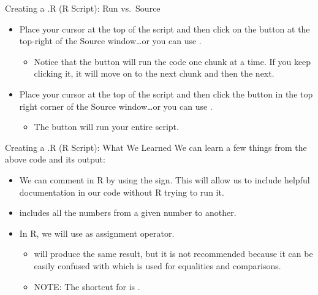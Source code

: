 \begin{frame}{Creating a .R (R Script): Run vs.\ Source}
\begin{itemize}
  \item Place your cursor at the top of the script and then click on the  button at the top-right of the Source window\ldots or you can use .
  \begin{itemize}
    \item Notice that the  button will run the code one chunk at a time. If you keep clicking it, it will move on to the next chunk and then the next.
  \end{itemize}
  \item Place your cursor at the top of the script and then click the  button in the top right corner of the Source window\ldots or you can use .
  \begin{itemize}
    \item The  button will run your entire script.
  \end{itemize}
\end{itemize}
\end{frame}

\begin{frame}{Creating a .R (R Script): What We Learned}
We can learn a few things from the above code and its output:
\begin{itemize}
  \item We can comment in R by using the \code{\#} sign. This will allow us to include helpful documentation in our code without R trying to run it.
  \item \code{:} includes all the numbers from a given number to another.
  \item In R, we will use \code{<-} as assignment operator.
  \begin{itemize}
    \item \code{=} will produce the same result, but it is not recommended because it can be easily confused with \code{==} which is used for equalities and comparisons.
    \item NOTE: The shortcut for \code{<-} is .
  \end{itemize}
\end{itemize}
\end{frame}

